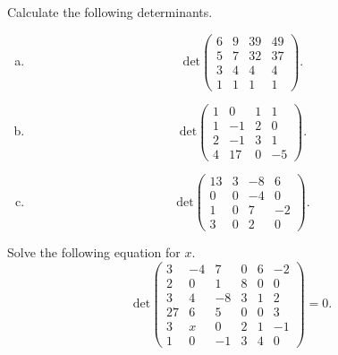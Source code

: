 \documentclass[a4paper,11pt]{article}
\begin{document}
 Calculate the following determinants.
\begin{enumerate}[(a)]
\item
  \[
    \text{det}
    \left(
      \begin{array}{rrrr}
        6 & 9 & 39 & 49 \\
        5 & 7 & 32 & 37 \\
        3 & 4 & 4 & 4 \\
        1 & 1 & 1 & 1
      \end{array}
    \right).
  \]
\item
  \[
    \text{det}
    \left(
      \begin{array}{rrrr}
        1 & 0 & 1 & 1 \\
        1 & -1 & 2 & 0 \\
        2 & -1 & 3 & 1 \\
        4 & 17 & 0 & -5
      \end{array}
    \right).
  \]
\item
  \[
    \text{det}
    \left(
      \begin{array}{rrrr}
        13 & 3 & -8 & 6 \\
        0 & 0 & -4 & 0 \\
        1 & 0 & 7 & -2 \\
        3 & 0 & 2 & 0
      \end{array}
    \right).
  \]
\end{enumerate}

 Solve the following equation for $x$.
\[
  \text{det}
  \left(
    \begin{array}{rrrrrr}
      3 & -4 & 7 & 0 & 6 & -2 \\
      2 & 0 & 1 & 8 & 0 & 0 \\
      3 & 4 & -8 & 3 & 1 & 2 \\
      27 & 6 & 5 & 0 & 0 & 3 \\
      3 & x & 0 & 2 & 1 & -1 \\
      1 & 0 & -1 & 3 & 4 & 0
    \end{array}
  \right)=0.
\] \\
\end{document}
